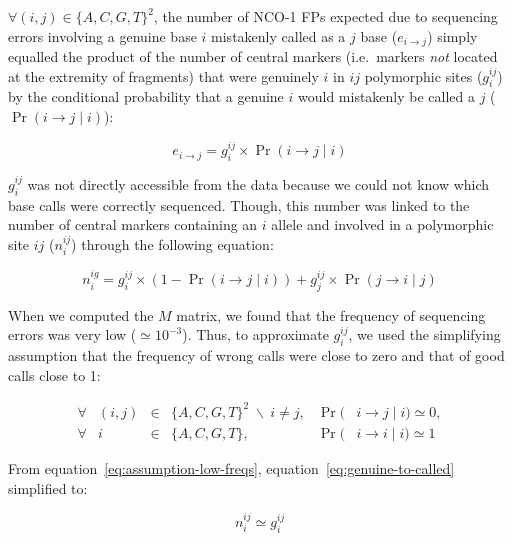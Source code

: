 $\forall (i,j) \in \{A, C, G, T\}^2$, the number of NCO-1 FPs expected due to sequencing errors involving a genuine base $i$ mistakenly called as a $j$ base ($e_{i\rightarrow j}$) simply equalled the product of the number of central markers (i.e.\ markers \textit{not} located at the extremity of fragments) that were genuinely $i$ in $ij$ polymorphic sites ($g_{i}^{ij}$) by the conditional probability that a genuine $i$ would mistakenly be called a $j$ ($\Pr( i\rightarrow j \mid i )$):

\begin{equation} \label{eq:nb-errors}
	e_{i\rightarrow j} = g_{i}^{ij} \times \Pr( i\rightarrow j \mid i )
\end{equation}


$g_{i}^{ij}$ was not directly accessible from the data because we could not know which base calls were correctly sequenced.
Though, this number was linked to the number of central markers containing an $i$ allele and involved in a polymorphic site $ij$ ($n_{i}^{ij}$) through the following equation:

\begin{equation} \label{eq:genuine-to-called}
	n_{i}^{ig} = g_{i}^{ij} \times ( 1 - \Pr( i\rightarrow j \mid i ) ) + g_{j}^{ij} \times \Pr( j\rightarrow i \mid j )
\end{equation}


When we computed the $M$ matrix, we found that the frequency of sequencing errors was very low ($\simeq 10^{-3}$).
Thus, to approximate $g_{i}^{ij}$, we used the simplifying assumption that the frequency of wrong calls were close to zero and that of good calls close to 1:

\begin{subequations} 
	\begin{alignat}{5}
		\forall &(i,j) &{}\in{}& \{A, C, G, T\}^2 \; \backslash \: i \neq j, &{}\Pr({}& i\rightarrow j \mid i ) \simeq 0,\label{eq:assumption-low-freqs}\\
		\forall &i	   &{}\in{}& \{A, C, G, T\},							 &{}\Pr({}& i\rightarrow i \mid i ) \simeq 1
	\end{alignat}
\end{subequations}


From equation~\ref{eq:assumption-low-freqs}, equation~\ref{eq:genuine-to-called} simplified to:

\begin{equation} \label{eq:genuine-to-called-simplified}
	n_{i}^{ij} \simeq g_{i}^{ij}
\end{equation}

